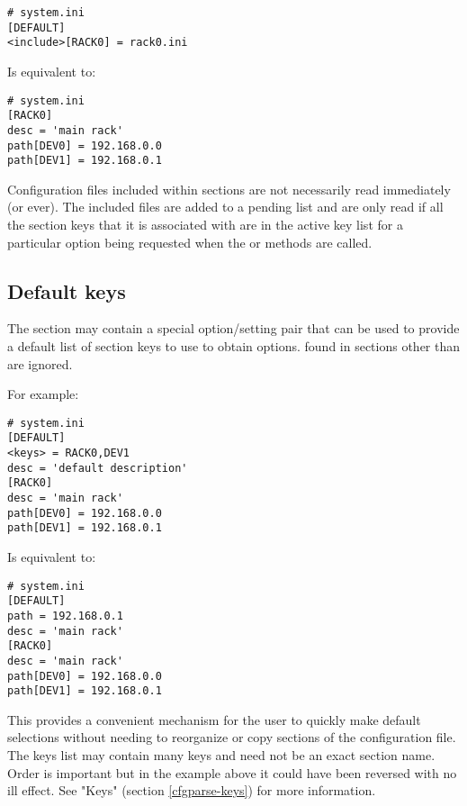 \documentclass{howto}
\begin{document}
\begin{verbatim}
# system.ini
[DEFAULT]
<include>[RACK0] = rack0.ini
\end{verbatim}

Is equivalent to:

\begin{verbatim}
# system.ini
[RACK0]
desc = 'main rack'
path[DEV0] = 192.168.0.0
path[DEV1] = 192.168.0.1
\end{verbatim}

Configuration files included within sections are not necessarily read
immediately (or ever).  The included files are added to a pending list
and are only read if all the section keys that it is associated with 
are in the active key list for a particular option being requested
when the  or  methods are called.

\subsection{Default keys\label{cfgparse-default-keys}}

The \code{[DEFAULT]} section may contain a special  option/setting
pair that can be used to provide a default list of section keys to use to 
obtain options.   found in sections other than \code{[DEFAULT]} 
are ignored.

For example:

\begin{verbatim}
# system.ini
[DEFAULT]
<keys> = RACK0,DEV1
desc = 'default description'
[RACK0]
desc = 'main rack'
path[DEV0] = 192.168.0.0
path[DEV1] = 192.168.0.1
\end{verbatim}

Is equivalent to:

\begin{verbatim}
# system.ini
[DEFAULT]
path = 192.168.0.1
desc = 'main rack'
[RACK0]
desc = 'main rack'
path[DEV0] = 192.168.0.0
path[DEV1] = 192.168.0.1
\end{verbatim}

This provides a convenient mechanism for the user to quickly make default 
selections without needing to reorganize or copy sections of the configuration
file.  The  keys list may contain many keys and need not
be an exact section name.  Order is important but in the example above 
it could have been reversed with no ill effect.  See "Keys" (section 
\ref{cfgparse-keys}) for more information.
\end{document}
